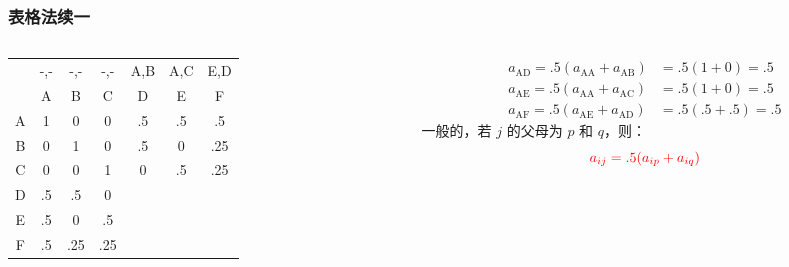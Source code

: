 \documentclass[serif,aspectratio=169]{beamer}
\begin{document}
\begin{frame}
  \frametitle{表格法\tiny{续一}}
  \begin{columns}
    \begin{column}{.5\textwidth}
      \centering
      \begin{tabular}{c|ccc|ccc}
        & -,- & -,- & -,- & A,B & A,C & E,D\\
        & A & B & C & D & E & F\\\hline
        A & 1 & 0 & 0 & .5 & .5 & .5\\
        B & 0 & 1 & 0 & .5 & 0 & .25\\
        C & 0 & 0 & 1 & 0 & .5 & .25\\\hline
        D & .5 & .5 & 0\\
        E & .5 & 0 & .5\\
        F & .5 & .25 & .25
      \end{tabular}
    \end{column}

    \begin{column}{.5\textwidth}
      \begin{align*}
        a_{\mathrm{AD}} = .5(a_{\mathrm{AA}}+a_{\mathrm{AB}}) &= .5(1+0)=.5\\
        a_{\mathrm{AE}} = .5(a_{\mathrm{AA}}+a_{\mathrm{AC}}) &= .5(1+0)=.5\\
        a_{\mathrm{AF}} = .5(a_{\mathrm{AE}}+a_{\mathrm{AD}}) &= .5(.5+.5)=.5
      \end{align*}
      一般的，若 $j$ 的父母为 $p$ 和 $q$，则：
      $$\color{red}a_{ij} = .5(a_{ip} + a_{iq})$$
    \end{column}
  \end{columns}
\end{frame}
\end{document}

